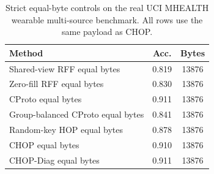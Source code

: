 \begin{table}[t]
\centering
\caption{Strict equal-byte controls on the real UCI MHEALTH wearable multi-source benchmark. All rows use the same payload as CHOP.}
\label{tab:strict-equal-byte-mhealth}
\begin{tabular}{lcc}
\toprule
Method & Acc. & Bytes \\
\midrule
Shared-view RFF equal bytes & 0.819 & 13876 \\
Zero-fill RFF equal bytes & 0.830 & 13876 \\
CProto equal bytes & 0.911 & 13876 \\
Group-balanced CProto equal bytes & 0.841 & 13876 \\
Random-key HOP equal bytes & 0.878 & 13876 \\
CHOP equal bytes & 0.910 & 13876 \\
CHOP-Diag equal bytes & 0.911 & 13876 \\
\bottomrule
\end{tabular}
\end{table}
